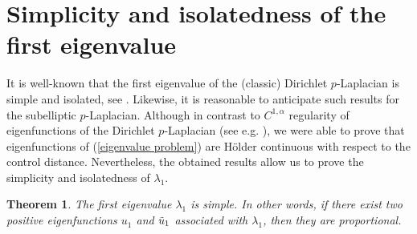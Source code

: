 \documentclass[a4paper,12pt,reqno]{amsart}
\renewcommand\eqref[1]{(\ref{#1})} %
\numberwithin{equation}{section}
\theoremstyle{plain}
\newtheorem{theorem}{Theorem}[section]
\theoremstyle{definition}
\begin{document}
\section{Simplicity and isolatedness of the first eigenvalue}\label{sec4}
It is well-known that the first eigenvalue of the (classic) Dirichlet $p$-Laplacian is simple and isolated, see \cite{Lin1990}. Likewise, it is reasonable to anticipate such results for the subelliptic $p$-Laplacian. Although in contrast to $C^{1,\alpha}$ regularity of eigenfunctions of the Dirichlet $p$-Laplacian (see e.g. \cite{dibenedetto1983}),  we were able to prove that  eigenfunctions of \eqref{eigenvalue problem}  are H\"older continuous with respect to the control distance. Nevertheless, the obtained results allow us to prove the simplicity and isolatedness of $\lambda_{1}$.
\begin{theorem}\label{simplicity theorem}
The first eigenvalue $\lambda_{1}$ is simple. In other words, if there exist two positive eigenfunctions $u_{1}$ and $\Tilde{u}_{1}$ associated with $\lambda_{1}$, then they are proportional.
\end{theorem}
\end{document}
